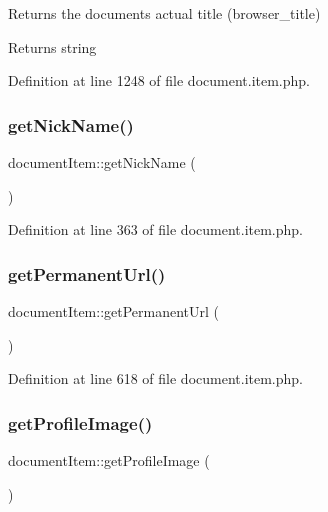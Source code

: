 Returns the document\textquotesingle{}s actual title (browser\+\_\+title) \begin{DoxyReturn}{Returns}
string 
\end{DoxyReturn}


Definition at line 1248 of file document.\+item.\+php.

\mbox{\label{classdocumentItem_ab91ca9e1defb1a570212baa4f380706a}} 
\subsubsection{\texorpdfstring{get\+Nick\+Name()}{getNickName()}}
{\footnotesize\ttfamily document\+Item\+::get\+Nick\+Name (\begin{DoxyParamCaption}{ }\end{DoxyParamCaption})}



Definition at line 363 of file document.\+item.\+php.

\mbox{\label{classdocumentItem_a8583e18888f4ad634ec23c7cd85dc172}} 
\subsubsection{\texorpdfstring{get\+Permanent\+Url()}{getPermanentUrl()}}
{\footnotesize\ttfamily document\+Item\+::get\+Permanent\+Url (\begin{DoxyParamCaption}{ }\end{DoxyParamCaption})}



Definition at line 618 of file document.\+item.\+php.

\mbox{\label{classdocumentItem_afb95c0b0d6d9106c737d8eeb51a3c834}} 
\subsubsection{\texorpdfstring{get\+Profile\+Image()}{getProfileImage()}}
{\footnotesize\ttfamily document\+Item\+::get\+Profile\+Image (\begin{DoxyParamCaption}{ }\end{DoxyParamCaption})}

